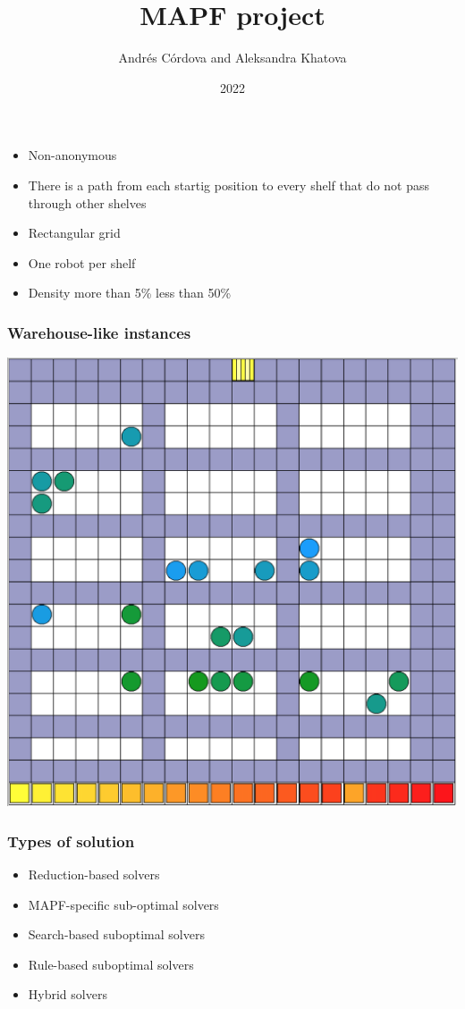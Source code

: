 \documentclass{beamer}
\title{MAPF project}
\author{Andrés Córdova and Aleksandra Khatova}
\institute{Unversity of Potsdam}
\date{2022}
\begin{document}
\frame{\titlepage}

\begin{frame}
\begin{itemize}
    \item Non-anonymous
    \item There is a path from each startig position to every shelf that do not pass through other shelves
    \item Rectangular grid
    \item One robot per shelf
    \item Density more than 5\% less than 50\%
\end{itemize}
\end{frame}

\begin{frame}
\frametitle{Warehouse-like instances}
\centering
\includegraphics[scale=0.3]{med_dense.png}
\end{frame}

\begin{frame}
\frametitle{Types of solution}
\begin{itemize}
    \item Reduction-based solvers
    \item MAPF-specific sub-optimal solvers
    \item Search-based suboptimal solvers
    \item Rule-based suboptimal solvers
    \item Hybrid solvers
\end{itemize}
\end{frame}
\end{document}
